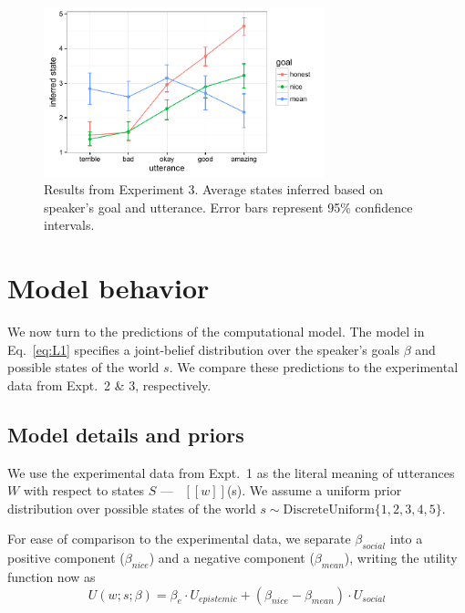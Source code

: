 \documentclass[10pt,letterpaper]{article}
\newcommand{\denote}[1]{\mbox{ $[\![ #1 ]\!]$}}
\begin{document}
\begin{figure}
\begin{centering} 
\includegraphics[width=3.2in]{figures/exp3.pdf}
\caption{\label{fig:exp3} Results from Experiment 3. Average states inferred based on speaker's goal and utterance. Error bars represent 95\% confidence intervals.}
\end{centering} 
\end{figure}

\section{Model behavior}

We now turn to the predictions of the computational model.
The model in Eq.~\ref{eq:L1} specifies a joint-belief distribution over the speaker's goals $\beta$ and possible states of the world $s$.
We compare these predictions to the experimental data from Expt.~2 \& 3, respectively.

\subsection{Model details and priors}

We use the experimental data from Expt.~1 as the literal meaning of utterances $W$ with respect to states $S$ --- \denote{w}(s).
We assume a uniform prior distribution over possible states of the world $s\sim \text{DiscreteUniform} \{1, 2, 3, 4, 5\}$. 

For ease of comparison to the experimental data, we separate $\beta_{social}$ into a positive component ($\beta_{nice}$) and a negative component ($\beta_{mean}$), writing the utility function now as
$$
U(w;s; \beta) = \beta_{e}\cdot U_{epistemic} + (\beta_{nice} - \beta_{mean}) \cdot U_{social}
$$

\end{document}
